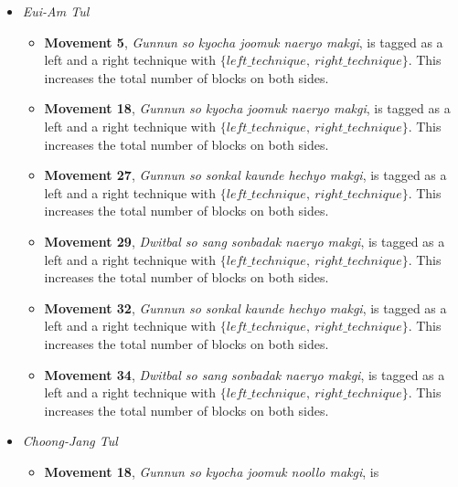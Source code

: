 \documentclass[10pt,twocolumn,a4paper]{article}
\begin{document}
\begin{itemize}
  \item
    \emph{Eui-Am Tul}
    \begin{itemize}
      \item
        {\bf Movement 5}, \emph{Gunnun so kyocha joomuk naeryo makgi}, is
        tagged as a left and a right technique with $\{left\_technique, \:
        right\_technique\}$. This increases the total number of blocks on both
        sides.
      \item
        {\bf Movement 18}, \emph{Gunnun so kyocha joomuk naeryo makgi}, is
        tagged as a left and a right technique with $\{left\_technique, \:
        right\_technique\}$. This increases the total number of blocks on both
        sides.
      \item
        {\bf Movement 27}, \emph{Gunnun so sonkal kaunde hechyo makgi}, is
        tagged as a left and a right technique with $\{left\_technique, \:
        right\_technique\}$. This increases the total number of blocks on both
        sides.
      \item
        {\bf Movement 29}, \emph{Dwitbal so sang sonbadak naeryo makgi}, is
        tagged as a left and a right technique with $\{left\_technique, \:
        right\_technique\}$. This increases the total number of blocks on both
        sides.
      \item
        {\bf Movement 32}, \emph{Gunnun so sonkal kaunde hechyo makgi}, is
        tagged as a left and a right technique with $\{left\_technique, \:
        right\_technique\}$. This increases the total number of blocks on both
        sides.
      \item
        {\bf Movement 34}, \emph{Dwitbal so sang sonbadak naeryo makgi}, is
        tagged as a left and a right technique with $\{left\_technique, \:
        right\_technique\}$. This increases the total number of blocks on both
        sides.
    \end{itemize}
  \item
    \emph{Choong-Jang Tul}
    \begin{itemize}
      \item
        {\bf Movement 18}, \emph{Gunnun so kyocha joomuk noollo makgi}, is

\end{itemize}
\end{itemize}
\end{document}
